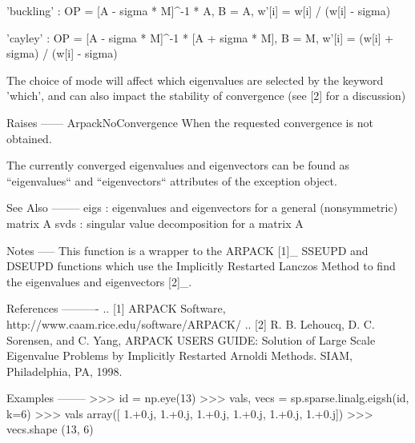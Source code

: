 \begin{DoxyVerb}
        'buckling' :
            OP = [A - sigma * M]^-1 * A,
            B = A,
            w'[i] = w[i] / (w[i] - sigma)

        'cayley' :
            OP = [A - sigma * M]^-1 * [A + sigma * M],
            B = M,
            w'[i] = (w[i] + sigma) / (w[i] - sigma)

    The choice of mode will affect which eigenvalues are selected by
    the keyword 'which', and can also impact the stability of
    convergence (see [2] for a discussion)

Raises
------
ArpackNoConvergence
    When the requested convergence is not obtained.

    The currently converged eigenvalues and eigenvectors can be found
    as ``eigenvalues`` and ``eigenvectors`` attributes of the exception
    object.

See Also
--------
eigs : eigenvalues and eigenvectors for a general (nonsymmetric) matrix A
svds : singular value decomposition for a matrix A

Notes
-----
This function is a wrapper to the ARPACK [1]_ SSEUPD and DSEUPD
functions which use the Implicitly Restarted Lanczos Method to
find the eigenvalues and eigenvectors [2]_.

References
----------
.. [1] ARPACK Software, http://www.caam.rice.edu/software/ARPACK/
.. [2] R. B. Lehoucq, D. C. Sorensen, and C. Yang,  ARPACK USERS GUIDE:
   Solution of Large Scale Eigenvalue Problems by Implicitly Restarted
   Arnoldi Methods. SIAM, Philadelphia, PA, 1998.

Examples
--------
>>> id = np.eye(13)
>>> vals, vecs = sp.sparse.linalg.eigsh(id, k=6)
>>> vals
array([ 1.+0.j,  1.+0.j,  1.+0.j,  1.+0.j,  1.+0.j,  1.+0.j])
>>> vecs.shape
(13, 6)\end{DoxyVerb}
 \hypertarget{namespacescipy_1_1sparse_1_1linalg_1_1eigen_1_1arpack_1_1arpack_a8d7ff385c1c89e754097d444c6c4cbbb}{}
